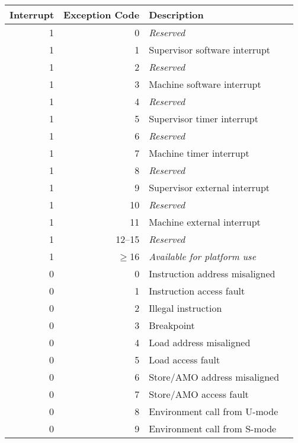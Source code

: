 \begin{table*}[htbp]
\begin{center}
\begin{tabular}{|r|r|l|l|}

  \hline
  Interrupt & Exception Code  & Description \\
  \hline	 
  1         & 0               & {\em Reserved} \\
  1         & 1               & Supervisor software interrupt \\
  1         & 2               & {\em Reserved} \\
  1         & 3               & Machine software interrupt \\ \hline
  1         & 4               & {\em Reserved} \\
  1         & 5               & Supervisor timer interrupt \\
  1         & 6               & {\em Reserved} \\
  1         & 7               & Machine timer interrupt \\ \hline
  1         & 8               & {\em Reserved} \\
  1         & 9               & Supervisor external interrupt \\
  1         & 10              & {\em Reserved} \\
  1         & 11              & Machine external interrupt \\ \hline
  1         & 12--15          & {\em Reserved} \\
  1         & $\ge$16         & {\em Available for platform use} \\ \hline
  0         & 0               & Instruction address misaligned \\
  0         & 1               & Instruction access fault \\
  0         & 2               & Illegal instruction \\   
  0         & 3               & Breakpoint \\
  0         & 4               & Load address misaligned \\
  0         & 5               & Load access fault \\
  0         & 6               & Store/AMO address misaligned \\
  0         & 7               & Store/AMO access fault \\
  0         & 8               & Environment call from U-mode\\
  0         & 9               & Environment call from S-mode \\

\end{tabular}
\end{center}
\end{table*}
